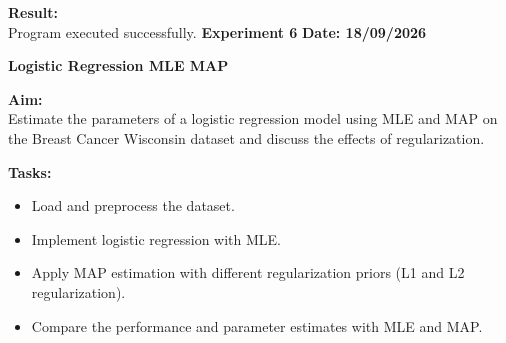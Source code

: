 \documentclass[12pt, a4paper]{article}
\begin{document}
\vspace{\baselineskip}

\noindent \textbf{Result:}\\
Program executed successfully.
\newpage
\noindent \textbf{Experiment 6} \hfill \textbf{Date: 18/09/2026}\\
\begin{center} \Large \textbf{Logistic Regression MLE MAP} \end{center}
\textbf{Aim:}\\
Estimate the parameters of a logistic regression model using MLE and MAP on the Breast Cancer Wisconsin dataset and discuss the effects of regularization.

\vspace{\baselineskip}
\noindent \textbf{Tasks:}\\
\vspace{-0.5\baselineskip}
\begin{itemize}[nosep]
    \item Load and preprocess the dataset.
    \item Implement logistic regression with MLE.
    \item Apply MAP estimation with different regularization priors (L1 and L2 regularization).
    \item Compare the performance and parameter estimates with MLE and MAP.
\end{itemize}
\end{document}
